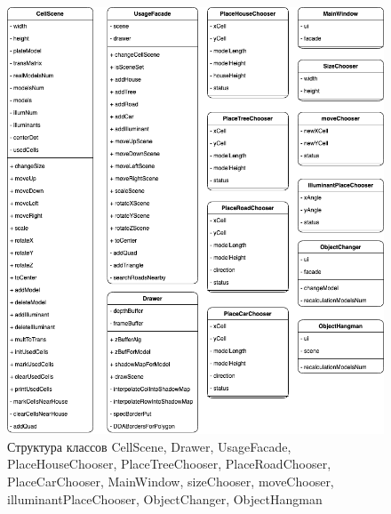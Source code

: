 \documentclass[a4paper,14pt, unknownkeysallowed]{extreport}
\begin{document}
\clearpage

\begin{figure}[h]
	\centering
	\includegraphics[scale=0.6]{img/scheme_2.png}
	\caption{Структура классов CellScene, Drawer, UsageFacade, PlaceHouseChooser, PlaceTreeChooser, PlaceRoadChooser, PlaceCarChooser, MainWindow, sizeChooser, moveChooser, illuminantPlaceChooser, ObjectChanger, ObjectHangman}
	\label{fig:scheme_2}
\end{figure} 

\clearpage
\end{document}
